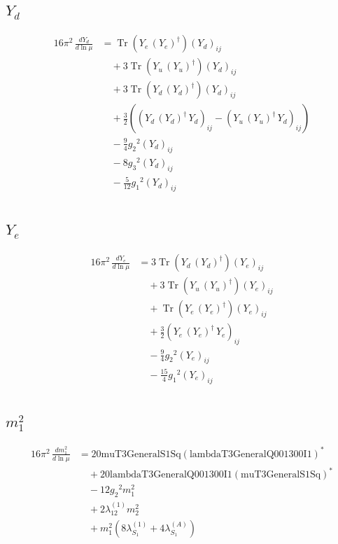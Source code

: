 \documentclass[10pt,a4paper]{article}
\begin{document}
\subsection*{$Y_d$}
\begin{align*}
16\pi^2\,\frac{d Y_d}{d\ln\mu} &=\operatorname{Tr}\!\left({Y_e}\,\left({Y_e}\right)^{\dagger}\right) \left({Y_d}\right)_{ij} \\
&\quad +3 \operatorname{Tr}\!\left({Y_u}\,\left({Y_u}\right)^{\dagger}\right) \left({Y_d}\right)_{ij} \\
&\quad +3 \operatorname{Tr}\!\left({Y_d}\,\left({Y_d}\right)^{\dagger}\right) \left({Y_d}\right)_{ij} \\
&\quad +\frac{3}{2} (\left({Y_d}\,\left({Y_d}\right)^{\dagger}\,{Y_d}\right)_{ij}-\left({Y_u}\,\left({Y_u}\right)^{\dagger}\,{Y_d}\right)_{ij}) \\
&\quad -\frac{9}{4} {g_2}^2 \left({Y_d}\right)_{ij} \\
&\quad -8 {g_3}^2 \left({Y_d}\right)_{ij} \\
&\quad -\frac{5}{12} {g_1}^2 \left({Y_d}\right)_{ij} \\
\end{align*}
\subsection*{$Y_e$}
\begin{align*}
16\pi^2\,\frac{d Y_e}{d\ln\mu} &=3 \operatorname{Tr}\!\left({Y_d}\,\left({Y_d}\right)^{\dagger}\right) \left({Y_e}\right)_{ij} \\
&\quad +3 \operatorname{Tr}\!\left({Y_u}\,\left({Y_u}\right)^{\dagger}\right) \left({Y_e}\right)_{ij} \\
&\quad +\operatorname{Tr}\!\left({Y_e}\,\left({Y_e}\right)^{\dagger}\right) \left({Y_e}\right)_{ij} \\
&\quad +\frac{3}{2} \left({Y_e}\,\left({Y_e}\right)^{\dagger}\,{Y_e}\right)_{ij} \\
&\quad -\frac{9}{4} {g_2}^2 \left({Y_e}\right)_{ij} \\
&\quad -\frac{15}{4} {g_1}^2 \left({Y_e}\right)_{ij} \\
\end{align*}
\subsection*{$m_1^2$}
\begin{align*}
16\pi^2\,\frac{d m_1^2}{d\ln\mu} &=20 \text{muT3GeneralS1Sq} \left(\text{lambdaT3GeneralQ001300I1}\right)^{*} \\
&\quad +20 \text{lambdaT3GeneralQ001300I1} \left(\text{muT3GeneralS1Sq}\right)^{*} \\
&\quad -12 {g_2}^2 {m_1^2} \\
&\quad +2 {\lambda_{12}^{(1)}} {m_2^2} \\
&\quad +{m_1^2} (8 {\lambda_{S_1}^{(1)}}+4 {\lambda_{S_1}^{(A)}}) \\
\end{align*}
\end{document}
